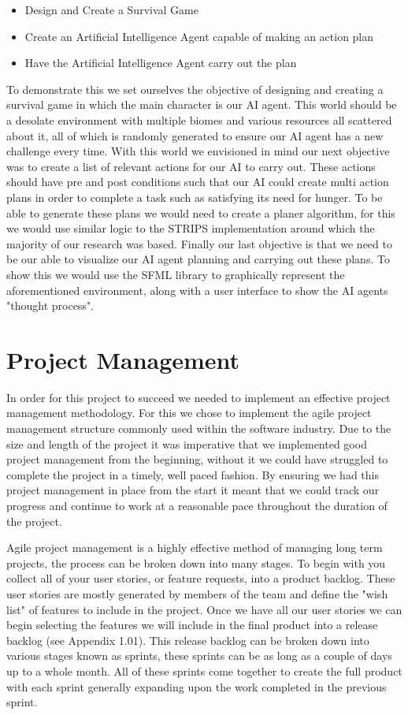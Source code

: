 \documentclass[a4paper]{report}
\begin{document}
\begin{itemize}
	\item Design and Create a Survival Game
	\item Create an Artificial Intelligence Agent capable of making an action plan
	\item Have the Artificial Intelligence Agent carry out the plan 
\end{itemize}

To demonstrate this we set ourselves the objective of designing and creating a survival game in which the main character is our AI agent. This world should be a desolate environment with multiple biomes and various resources all scattered about it, all of which is randomly generated to ensure our AI agent has a new challenge every time. With this world we envisioned in mind our next objective was to create a list of relevant actions for our AI to carry out. These actions should have pre and post conditions such that our AI could create multi action plans in order to complete a task such as satisfying its need for hunger. To be able to generate these plans we would need to create a planer algorithm, for this we would use similar logic to the STRIPS implementation around which the majority of our research was based. Finally our last objective is that we need to be our able to visualize our AI agent planning and carrying out these plans. To show this we would use the SFML library to graphically represent the aforementioned environment, along with a user interface to show the AI agents "thought process".
 
\chapter{Project Management}
In order for this project to succeed we needed to implement an effective project management methodology. For this we chose to implement the agile project management structure commonly used within the software industry. Due to the size and length of the project it was imperative that we implemented good project management from the beginning, without it we could have struggled to complete the project in a timely, well paced fashion. By ensuring we had this project management in place from the start it meant that we could track our progress and continue to work at a reasonable pace throughout the duration of the project.

Agile project management is a highly effective method of managing long term projects, the process can be broken down into many stages. To begin with you collect all of your user stories, or feature requests, into a product backlog. These user stories are mostly generated by members of the team and define the "wish list" of features to include in the project. Once we have all our user stories we can begin selecting the features we will include in the final product into a release backlog (see Appendix 1.01). This release backlog can be broken down into various stages known as sprints, these sprints can be as long as a couple of days up to a whole month. All of these sprints come together to create the full product with each sprint generally expanding upon the work completed in the previous sprint.
\end{document}
